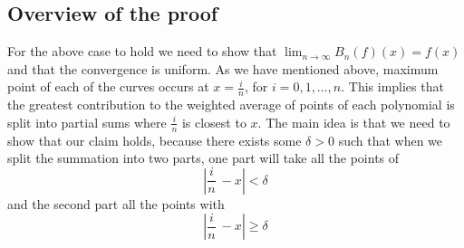 \documentclass{article}
\begin{document}
\subsection{Overview of the proof}
For the above case to hold we need to show that $\lim_{n \rightarrow{\infty} }B_n(f)(x)=f(x)$ and that the convergence is uniform.
As we have mentioned above, maximum point of each of the curves occurs at $x=\frac{i}{n}$, for $i=0,1, \dots ,n$.
This implies that the greatest contribution to the weighted average of points of each polynomial is split into partial sums where $\frac{i}{n}$ is closest to $x$.
The main idea is that we need to show that our claim holds, because there exists some $\delta>0$ such that when we split the summation into two parts, one part will take all the points of
\begin{equation*}
\left|\frac{i}{n}\ - x\right|< \delta    
\end{equation*}
 and the second part all the points with 
 \begin{equation*}
  \left|\frac{i}{n}\ - x\right|\geq \delta   
 \end{equation*}
\end{document}
